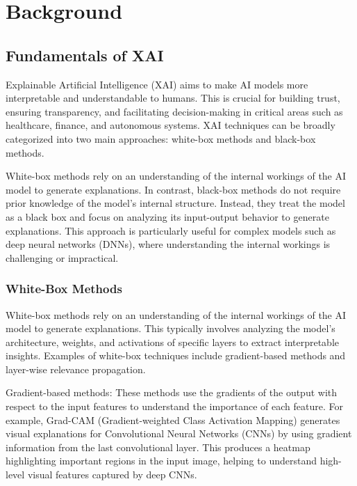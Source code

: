 \documentclass{article}
\begin{document}
\section{Background}

\subsection{Fundamentals of XAI}


Explainable Artificial Intelligence (XAI) aims to make AI models more interpretable and understandable to humans. This is crucial for building trust, ensuring transparency, and facilitating decision-making in critical areas such as healthcare, finance, and autonomous systems. XAI techniques can be broadly categorized into two main approaches: white-box methods and black-box methods.

White-box methods rely on an understanding of the internal workings of the AI model to generate explanations. In contrast, black-box methods do not require prior knowledge of the model’s internal structure. Instead, they treat the model as a black box and focus on analyzing its input-output behavior to generate explanations. This approach is particularly useful for complex models such as deep neural networks (DNNs), where understanding the internal workings is challenging or impractical.

\subsubsection{White-Box Methods}
White-box methods rely on an understanding of the internal workings of the AI model to generate explanations. This typically involves analyzing the model’s architecture, weights, and activations of specific layers to extract interpretable insights. Examples of white-box techniques include gradient-based methods and layer-wise relevance propagation.

Gradient-based methods: These methods use the gradients of the output with respect to the input features to understand the importance of each feature. For example, Grad-CAM (Gradient-weighted Class Activation Mapping) generates visual explanations for Convolutional Neural Networks (CNNs) by using gradient information from the last convolutional layer. This produces a heatmap highlighting important regions in the input image, helping to understand high-level visual features captured by deep CNNs.
\end{document}

